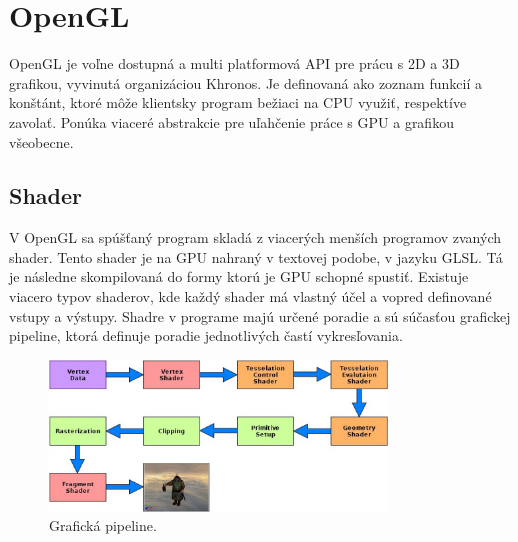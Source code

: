\section{OpenGL}

OpenGL je voľne dostupná a multi platformová API pre prácu s 2D a 3D grafikou, vyvinutá organizáciou Khronos. Je definovaná ako zoznam funkcií a konštánt, ktoré môže klientsky program bežiaci na CPU využiť, respektíve zavolať. Ponúka viaceré abstrakcie pre uľahčenie práce s GPU a grafikou všeobecne.

\subsection*{Shader}

V OpenGL sa spúšťaný program skladá z viacerých menších programov zvaných shader. Tento shader je na GPU nahraný v textovej podobe, v jazyku GLSL. Tá je následne skompilovaná do formy ktorú je GPU schopné spustiť. Existuje viacero typov shaderov, kde každý shader má vlastný účel a vopred definované vstupy a výstupy. Shadre v programe majú určené poradie a sú súčasťou grafickej pipeline, ktorá definuje poradie jednotlivých častí vykresľovania.

\begin{figure}[H]
	\centering
	\includegraphics[width=0.8\textwidth]{obrazky-figures/pipeline.eps}
	\caption{Grafická pipeline.}
	\label{pipeline}
\end{figure}

